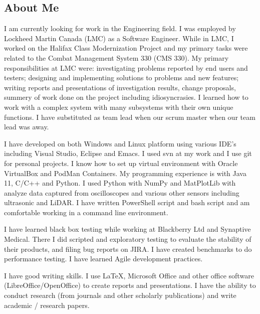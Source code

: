 \subsection*{\color{draculapurple}About Me}
I am currently looking for work in the Engineering field. I was employed by Lockheed Martin Canada (LMC) as a Software Engineer. While in LMC, I worked on the Halifax Class Modernization Project and my primary tasks were related to the Combat Management System 330 (CMS 330). My primary responsibilities at LMC were: investigating problems reported by end users and testers; designing and implementing solutions to problems and new features; writing reports and presentations of investigation results, change proposals, summery of work done on the project including idiosyncrasies. I learned how to work with a complex system with many subsystems with their own unique functions. I have substituted as team lead when our scrum master when our team lead was away.

I have developed on both Windows and Linux platform using various IDE's including Visual Studio, Eclipse and Emacs. I used svn at my work and I use git for personal projects. I know how to set up virtual environment with Oracle VirtualBox and PodMan Containers. My programming experience is with Java 11, C/C++ and Python.
I used Python with NumPy and MatPlotLib with analyze data captured from oscilloscopes and various other sensors including ultrasonic and LiDAR. I have written PowerShell script and bash script and am comfortable working in a command line environment.

I have learned black box testing while working at Blackberry Ltd and Synaptive Medical. There I did scripted and exploratory testing to evaluate the stability of their products, and filing bug reports on JIRA. I have created benchmarks to do performance testing. I have learned Agile development practices.

I have good writing skills. I use \LaTeX, Microsoft Office and other office software (LibreOffice/OpenOffice) to create reports and presentations. I have the ability to conduct research (from journals and other scholarly publications) and write academic / research papers.
